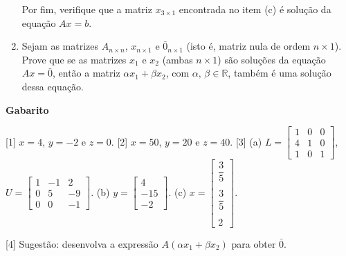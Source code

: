 \documentclass[12pt,a4paper]{article}
\begin{document}
\begin{enumerate}
    Por fim, verifique que a matriz $x_{3\times 1}$ encontrada no item (c) 
    é solução da equação $Ax = b$.

  \item Sejam as matrizes $A_{n\times n}$, $x_{n\times 1}$ e 
    $\bar{0}_{n\times 1}$ (isto é, matriz nula de ordem $n\times 1$).
    Prove que se as matrizes $x_1$ e $x_2$ (ambas $n\times 1$) são
    soluções da equação $Ax = \bar{0}$, então a matriz $\alpha x_1 + \beta x_2$,
    com $\alpha,\,\beta\in\mathbb{R}$, também é uma solução dessa equação.

\end{enumerate}
  
\begin{center}
  \textbf{Gabarito}
\end{center}

[1] $x = 4$, $y = -2$ e $z = 0$. 
[2] $x = 50$, $y = 20$ e $z = 40$.  
[3]
(a) $L =
  \begin{bmatrix}
    1 & 0 & 0 \\
    4 & 1 & 0 \\
    1 & 0 & 1
  \end{bmatrix}$, 
$U =
  \begin{bmatrix}
    1 & -1 & 2 \\
    0 & 5 & -9 \\
    0 & 0 & -1
  \end{bmatrix}$. 
(b) $y =
  \begin{bmatrix}
    4 \\
    -15 \\
    -2
  \end{bmatrix}$. 
(c) $x =
  \begin{bmatrix}
    \dfrac{3}{5}\\ \\
    \dfrac{3}{5}\\ \\
    2
  \end{bmatrix}$. 

[4] Sugestão: desenvolva a expressão $A(\alpha x_1 + \beta x_2)$ para obter $\bar{0}$. 
\end{document}
